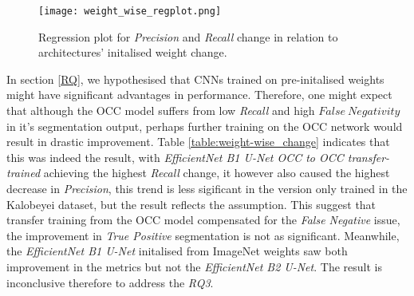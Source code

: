 \documentclass[11pt, a4paper, twoside]{report}
\begin{document}
\begin{table}[H]
  \centering
  \label{table:weight-wise_change}
  \caption{Initalised weight change in available CNNs and their effects on the metrics}
\end{table}

\begin{figure}[H]
  \centering
  \texttt{[image: weight\_wise\_regplot.png]}
  \caption{Regression plot for \textit{Precision} and \textit{Recall} change in relation to architectures' initalised weight change.}
  \label{fig:weight_regplot}
\end{figure}

In section \ref{RQ}, we hypothesised that CNNs trained on pre-initalised weights might have significant advantages in performance. Therefore, one might expect that although the OCC model suffers from low \textit{Recall} and high $False\ Negativity$ in it's segmentation output, perhaps further training on the OCC network would result in drastic improvement. Table \ref{table:weight-wise_change} indicates that this was indeed the result, with \textit{EfficientNet B1 U-Net OCC to OCC transfer-trained} achieving the highest \textit{Recall} change, it however also caused the highest decrease in \textit{Precision}, this trend is less sigificant in the version only trained in the Kalobeyei dataset, but the result reflects the assumption. This suggest that transfer training from the OCC model compensated for the \textit{False Negative} issue, the improvement in \textit{True Positive} segmentation is not as significant. Meanwhile, the \textit{EfficientNet B1 U-Net} initalised from ImageNet weights saw both improvement in the metrics but not the \textit{EfficientNet B2 U-Net}. The result is inconclusive therefore to address the \textit{RQ3}.\\\par
\end{document}

